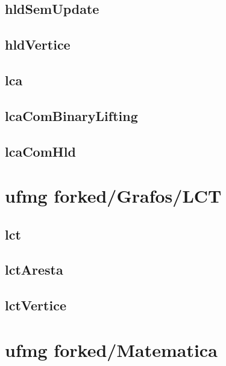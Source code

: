 \subsection{hldSemUpdate}
\raggedbottom
\hrulefill
\subsection{hldVertice}
\raggedbottom
\hrulefill
\subsection{lca}
\raggedbottom
\hrulefill
\subsection{lcaComBinaryLifting}
\raggedbottom
\hrulefill
\subsection{lcaComHld}
\raggedbottom
\hrulefill

\section{ufmg forked/Grafos/LCT}
\subsection{lct}
\raggedbottom
\hrulefill
\subsection{lctAresta}
\raggedbottom
\hrulefill
\subsection{lctVertice}
\raggedbottom
\hrulefill

\section{ufmg forked/Matematica}
